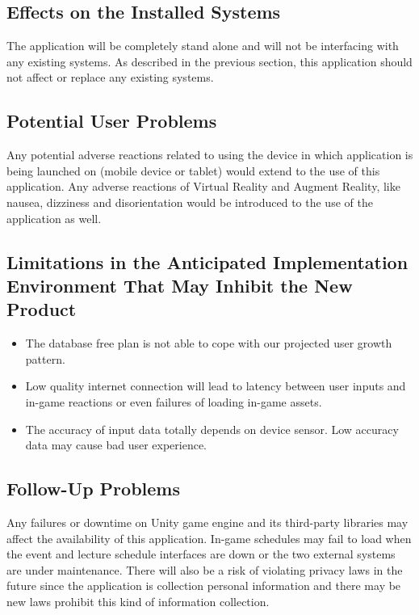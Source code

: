 \documentclass[12pt]{article}
\begin{document}
\subsection{Effects on the Installed Systems}

The application will be completely stand alone and will not be interfacing with any existing systems.  As described in the previous section, this application should not affect or replace any existing systems.

\subsection{Potential User Problems}

Any potential adverse reactions related to using the device in which application is being launched on (mobile device or tablet) would extend to the use of this application.  Any adverse reactions of Virtual Reality and Augment Reality, like nausea, dizziness and disorientation would be introduced to the use of the application as well.

\subsection{Limitations in the Anticipated Implementation Environment That May
Inhibit the New Product}

\begin{itemize}
\item The database free plan is not able to cope with our projected user growth pattern.
\item Low quality internet connection will lead to latency between user inputs and in-game reactions or even failures of loading in-game assets.
\item The accuracy of input data totally depends on device sensor. Low accuracy data may cause bad user experience.
\end{itemize}

\subsection{Follow-Up Problems}

Any failures or downtime on Unity game engine and its third-party libraries may affect the availability of this application. In-game schedules may fail to load when the event and lecture schedule interfaces are down or the two external systems are under maintenance. There will also be a risk of violating privacy laws in the future since the application is collection personal information and there may be new laws prohibit this kind of information collection.
\end{document}
